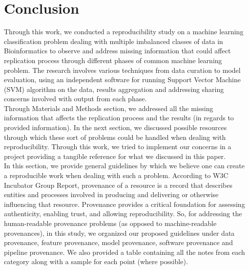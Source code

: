 \section {Conclusion}



Through this work, we conducted a reproducibility study on a machine learning classification problem dealing with multiple imbalanced 
classes of data in Bioinformatics to observe and address missing information that could affect replication process through 
different phases of common machine learning problem. The research involves various techniques from data curation to model evaluation, 
using an independent software for running Support Vector Machine (SVM) algorithm on the data, results aggregation and addressing 
sharing concerns involved with output from each phase.\\

Through Materials and Methods section, we addressed all the missing information that affects the replication process and the results (in 
regards to provided information). In the next section, we discussed possible resources through which these sort of problems 
could be handled when dealing with reproducibility. Through this work, we tried to implement our concerns in a project providing 
a tangible reference for what we discussed in this paper.\\ 

In this section, we provide general guidelines by which we believe one can create a reproducible work when dealing with such a problem. 
According to W3C Incubator Group Report, provenance of a resource is a record that describes entities and processes involved in producing 
and delivering or otherwise influencing that resource. Provenance provides a critical foundation for assessing authenticity, enabling trust, and allowing reproducibility.\cite{w3c} So, for addressing the human-readable provenance problems (as opposed to machine-readable provenances), 
in this study, we organized our proposed guidelines under data provenance, feature provenance, model provenance, software provenance 
and pipeline provenance. We also provided a table containing all the notes from each category along with a sample for each point (where possible).\\ 

